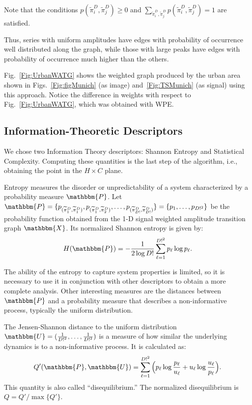 \documentclass[journal]{IEEEtran}
\begin{document}
	Note that the conditions $p(\widetilde\pi^D_i, \widetilde\pi^D_j) \ge 0$ and $\sum_{\widetilde\pi^D_i, \widetilde\pi^D_j} p(\widetilde\pi^D_i, \widetilde\pi^D_j) = 1$ are satisfied.
	
	Thus, series with uniform amplitudes have edges with probability of occurrence well distributed along the graph, while those with large peaks have edges with probability of occurrence much higher than the others.
	
	Fig.~\ref{Fig:UrbanWATG} shows the weighted graph produced by the urban  area shown in Figs.~\ref{Fig:figMunich} (as image) and~\ref{Fig:TSMunich} (as signal) using this approach.
	Notice the difference in weights with respect to Fig.~\ref{Fig:UrbanWATG}, which was obtained with WPE.
	
	
	\subsection{Information-Theoretic Descriptors}\label{HC}
	
	We chose two Information Theory descriptors: Shannon Entropy and Statistical Complexity.
	Computing these quantities is the last step of the algorithm, i.e., obtaining the point in the $H \times C$ plane.
	
	Entropy measures the disorder or unpredictability of a system characterized by a probability measure $\mathbbm{P}$.
	Let $\mathbbm{P} = \{p_{(\widetilde\pi^D_1, \widetilde\pi^D_1)}, p_{(\widetilde\pi^D_1, \widetilde\pi^D_2)}, \dots, p_{(\widetilde\pi^D_{D!}, \widetilde\pi^D_{D!})} \} = \{p_1,\dots,p_{D!^2}\}$ be the probability function obtained from the \mbox{1-D} signal weighted amplitude transition graph $\mathbbm{X}$.
	Its normalized Shannon entropy is given by:	
	\begin{equation}
	H(\mathbbm{P}) = -\frac1{2\log D!}\sum_{\ell=1}^{D!^2} p_{\ell} \log p_{\ell} .
	\label{eq:Entropia}
	\end{equation}
	
	The ability of the entropy to capture system properties is limited, so it is necessary to use it in conjunction with other des\-criptors to obtain a more complete analysis.
	Other interesting measures are the distances between $\mathbbm{P}$ and a probability measure that describes a non-informative process, typically the uniform distribution.
	
	The Jensen-Shannon distance to the uniform distribution $\mathbbm{U} = (\frac{1}{D!^2}, \dots, \frac{1}{D!^2})$ is a measure of how similar the underlying dynamics is to a non-informative process.
	It is calculated as:
	\begin{equation}
	Q'(\mathbbm{P}, \mathbbm{U}) = \sum_{\ell=1}^{D!^2} \Big(p_\ell \log\frac{p_\ell}{u_\ell} +
	u_\ell \log\frac{u_\ell}{p_\ell}
	\Big).
	\end{equation}
	This quantity is also called ``disequilibrium.''
	The normalized disequilibrium is $ Q=Q'/\max\{Q'\}$.
	
\end{document}
